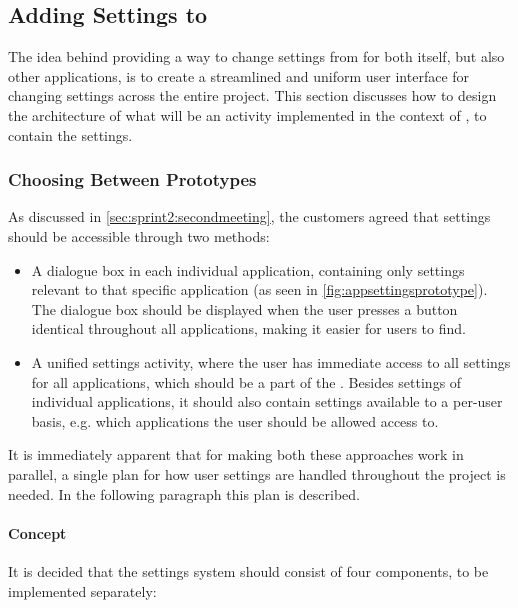 \subsection{Adding Settings to \giraf}\label{sec:sprint3:designsettings}
The idea behind providing a way to change settings from \launcher for both itself, but also other \giraf applications, is to create a streamlined and uniform user interface for changing settings across the entire project.
This section discusses how to design the architecture of what will be an activity implemented in the context of \launcher, to contain the settings.

\subsubsection{Choosing Between Prototypes}
As discussed in \cref{sec:sprint2:secondmeeting}, the customers agreed that settings should be accessible through two methods:

\begin{itemize}
	\item A dialogue box in each individual application, containing only settings relevant to that specific application (as seen in \cref{fig:appsettingsprototype}). 
	The dialogue box should be displayed when the user presses a button identical throughout all \giraf applications, making it easier for users to find.
	\item A unified settings activity, where the user has immediate access to all settings for all \giraf applications, which should be a part of the \launcher. 
	Besides settings of individual applications, it should also contain settings available to a per-user basis, e.g. which applications the user should be allowed access to.
\end{itemize}

It is immediately apparent that for making both these approaches work in parallel, a single plan for how user settings are handled throughout the \giraf project is needed. 
In the following paragraph this plan is described.

\paragraph{Concept}
It is decided that the settings system should consist of four components, to be implemented separately:

